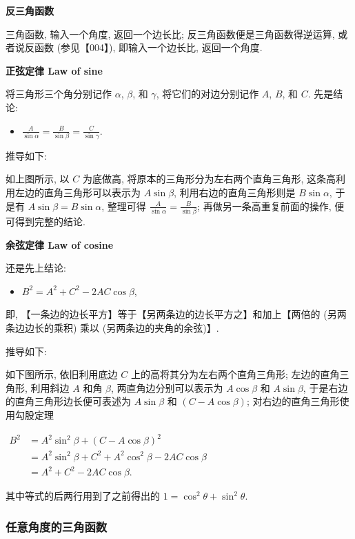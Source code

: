 \textbf{反三角函数}

三角函数, 输入一个角度, 返回一个边长比; 反三角函数便是三角函数得逆运算,
或者说反函数 (参见【004】), 即输入一个边长比, 返回一个角度.

\textbf{正弦定律 Law of sine}

将三角形三个角分别记作 \(\alpha\), \(\beta\), 和 \(\gamma\),
将它们的对边分别记作 \(A\), \(B\), 和 \(C\). 先是结论:

\begin{itemize}
\tightlist
\item
  \(\boxed{\frac{A}{\sin\alpha}=\frac{B}{\sin\beta}=\frac{C}{\sin\gamma}}\).
\end{itemize}

推导如下:

如上图所示, 以 \(C\) 为底做高, 将原本的三角形分为左右两个直角三角形,
这条高利用左边的直角三角形可以表示为 \(A\sin\beta\),
利用右边的直角三角形则是 \(B\sin\alpha\), 于是有
\(A\sin\beta=B\sin\alpha\), 整理可得
\(\frac{A}{\sin\alpha}=\frac{B}{\sin\beta}\);
再做另一条高重复前面的操作, 便可得到完整的结论.

\textbf{余弦定律 Law of cosine}

还是先上结论:

\begin{itemize}
\tightlist
\item
  \(\boxed{B^2=A^2+C^2-2AC\cos\beta}\),
\end{itemize}

即, 【一条边的边长平方】等于【另两条边的边长平方之】和加上【两倍的
(另两条边边长的乘积) 乘以 (另两条边的夹角的余弦)】.

推导如下:

如下图所示, 依旧利用底边 \(C\) 上的高将其分为左右两个直角三角形;
左边的直角三角形, 利用斜边 \(A\) 和角 \(\beta\), 两直角边分别可以表示为
\(A\cos\beta\) 和 \(A\sin\beta\), 于是右边的直角三角形边长便可表述为
\(A\sin\beta\) 和 \((C-A\cos\beta)\); 对右边的直角三角形使用勾股定理

\(\begin{aligned}B^2&=A^2\sin^2\beta+(C-A\cos\beta)^2\\ &=A^2\sin^2\beta+C^2+A^2\cos^2\beta-2AC\cos\beta\\ &=A^2+C^2-2AC\cos\beta.\end{aligned}\)

其中等式的后两行用到了之前得出的 \(1=\cos^2\theta+\sin^2\theta\).

\hypertarget{ux4efbux610fux89d2ux5ea6ux7684ux4e09ux89d2ux51fdux6570}{%
\subsubsection{任意角度的三角函数}\label{ux4efbux610fux89d2ux5ea6ux7684ux4e09ux89d2ux51fdux6570}}

